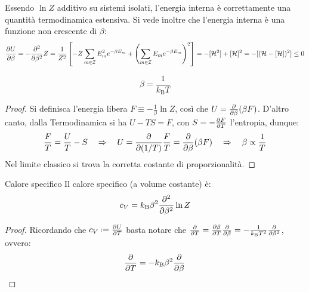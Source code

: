 Essendo $ \ln Z $ additivo su sistemi isolati, l'energia interna è correttamente una quantità termodinamica estensiva. Si vede inoltre che l'energia interna è una funzione non crescente di $ \beta $:
\begin{equation*}
	\frac{\partial U}{\partial \beta} = - \frac{\partial^2}{\partial \beta^2} Z = \frac{1}{Z^2} \left[ -Z \sum_{m \in \mathcal{I}} E_m^2 e^{-\beta E_m} + \left( \sum_{m \in \mathcal{I}} E_m e^{-\beta E_m} \right)^2 \right] = - [\mathcal{H}^2] + [\mathcal{H}]^2 = - [(\mathcal{H} - [\mathcal{H}])^2] \le 0
\end{equation*}

\begin{lemma}[before upper = {\tcbtitle}]{}{}
	\begin{equation}
		\beta = \frac{1}{k_\text{B} T}
	\end{equation}

	\tcblower

	\begin{proof}
		Si definisca l'energia libera $ F \equiv - \frac{1}{\beta} \ln Z $, così che $ U = \frac{\partial}{\partial \beta} (\beta F) $. D'altro canto, dalla Termodinamica si ha $ U - TS = F $, con $ S = - \frac{\partial F}{\partial T} $ l'entropia, dunque:
		\begin{equation*}
			\frac{F}{T} = \frac{U}{T} - S
			\quad \Rightarrow \quad
			U = \frac{\partial}{\partial(1/T)} \frac{F}{T} = \frac{\partial}{\partial \beta} (\beta F)
			\quad \Rightarrow \quad
			\beta \propto \frac{1}{T}
		\end{equation*}
		Nel limite classico si trova la corretta costante di proporzionalità.
	\end{proof}
\end{lemma}

\begin{proposition}{Calore specifico}{}
	Il calore specifico (a volume costante) è:
	\begin{equation}
		c_V = k_\text{B} \beta^2 \frac{\partial^2}{\partial \beta^2} \ln Z
		\label{eq:cal-spec-z}
	\end{equation}

	\tcblower

	\begin{proof}
		Ricordando che $ c_V \defeq \frac{\pa U}{\pa T} $ basta notare che $ \frac{\partial}{\partial T} = \frac{\partial \beta}{\partial T} \frac{\partial}{\partial \beta} = - \frac{1}{k_\text{B} T^2} \frac{\partial}{\partial \beta^2} $, ovvero:
		\begin{equation}
			\frac{\partial}{\partial T} = - k_\text{B} \beta^2 \frac{\partial}{\partial \beta}
		\end{equation}
	\end{proof}
\end{proposition}

